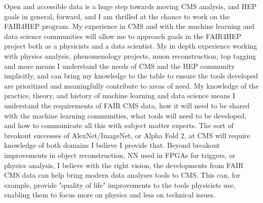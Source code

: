 \documentclass[11pt]{article}
\begin{document}

Open and accessible data is a huge step towards moving CMS analysis, and HEP goals in general, forward, and I am thrilled at the chance to work on the FAIR4HEP program. My experience in CMS and with the machine learning and data science communities will allow me to approach goals in the FAIR4HEP project both as a physicists and a data scientist. My in depth experience working with physics analysis, phenomenology projects, muon reconstruction, top tagging and more means I understand the needs of CMS and the HEP community implicitly, and can bring my knowledge to the table to ensure the tools developed are prioritized and meaningfully contribute to areas of need. My knowledge of the practice, theory, and history of machine learning and data science means I understand the requirements of FAIR CMS data, how it will need to be shared with the machine learning communities, what tools will need to be developed, and how to communicate all this with subject matter experts. The sort of breakout successes of AlexNet/ImageNet, or Alpha Fold 2, at CMS will require knowledge of both domains I believe I provide that. Beyond breakout improvements in object reconstruction, NN used in FPGAs for triggers, or physics analysis, I believe with the right vision, the developments from FAIR CMS data can help bring modern data analyses tools to CMS. This can, for example, provide "quality of life" improvements to the tools physicists use, enabling them to focus more on physics and less on technical issues. 


\end{document}
